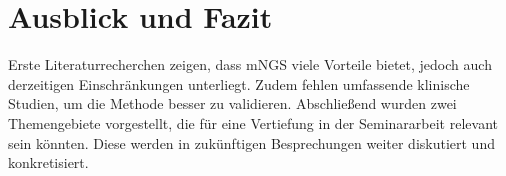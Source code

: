 \documentclass[a4paper, conference]{IEEEtran}
\begin{document}
\section{Ausblick und Fazit}
Erste Literaturrecherchen zeigen, dass mNGS viele Vorteile bietet, jedoch auch derzeitigen Einschränkungen unterliegt. Zudem fehlen umfassende klinische Studien, um die Methode besser zu validieren. Abschließend wurden zwei Themengebiete vorgestellt, die für eine Vertiefung in der Seminararbeit relevant sein könnten. Diese werden in zukünftigen Besprechungen weiter diskutiert und konkretisiert.   




\end{document}

